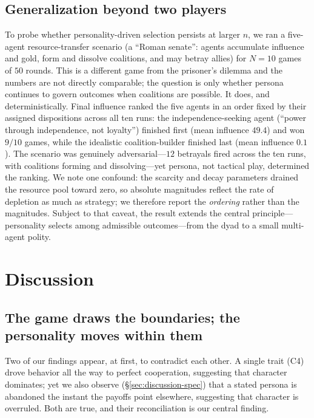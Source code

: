 \subsection{Generalization beyond two players}
\label{sec:results-senate}
To probe whether personality-driven selection persists at larger $n$, we ran a five-agent resource-transfer scenario (a ``Roman senate'': agents accumulate influence and gold, form and dissolve coalitions, and may betray allies) for $N=10$ games of $50$ rounds. This is a different game from the prisoner's dilemma and the numbers are not directly comparable; the question is only whether persona continues to govern outcomes when coalitions are possible. It does, and deterministically. Final influence ranked the five agents in an order fixed by their assigned dispositions across all ten runs: the independence-seeking agent (``power through independence, not loyalty'') finished first (mean influence $49.4$) and won $9/10$ games, while the idealistic coalition-builder finished last (mean influence $0.1$). The scenario was genuinely adversarial---$12$ betrayals fired across the ten runs, with coalitions forming and dissolving---yet persona, not tactical play, determined the ranking. We note one confound: the scarcity and decay parameters drained the resource pool toward zero, so absolute magnitudes reflect the rate of depletion as much as strategy; we therefore report the \emph{ordering} rather than the magnitudes. Subject to that caveat, the result extends the central principle---personality selects among admissible outcomes---from the dyad to a small multi-agent polity.

\section{Discussion}
\label{sec:discussion}

\subsection{The game draws the boundaries; the personality moves within them}
Two of our findings appear, at first, to contradict each other. A single trait (C4) drove behavior all the way to perfect cooperation, suggesting that character dominates; yet we also observe (\S\ref{sec:discussion-spec}) that a stated persona is abandoned the instant the payoffs point elsewhere, suggesting that character is overruled. Both are true, and their reconciliation is our central finding.

